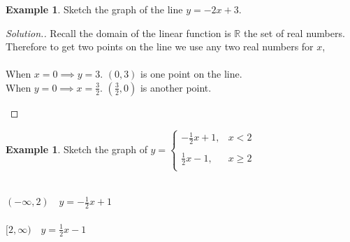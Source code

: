 \documentclass[11pt,a4paper]{article}
\theoremstyle{definition}
\newtheorem{example}[thm]{Example}
\newenvironment{solution}
  {\renewcommand{\qedsymbol}{}\begin{proof}[\textit{Solution}.]}
  {\end{proof}}
\begin{document}
\begin{example}

Sketch the graph of the line $y=-2x+3$.
\end{example}
\begin{solution}

Recall the domain of the linear function is $\mathbb{R}$ the set of real numbers. Therefore to get two points on the line we use any two real numbers for $x$,\\\\
When $x=0\implies y=3$. $(0,3)$ is one point on the line.\\
When $y=0\implies x=\frac{3}{2}$. $\left(\frac{3}{2},0\right)$ is another point.


\begin{figure}[H]
\centering
{}
\end{figure}
\end{solution}
\begin{example}

Sketch the graph of $y=
\begin{cases}
-\frac{1}{2}x+1, &x<2\\\\
\frac{1}{2}x-1, & x\geq 2\\
\end{cases}
$\\\\
\vspace{0.2cm}


$(-\infty,2)\quad  y=-\frac{1}{2}x+1$\\\\
$[2,\infty)\quad  y=\frac{1}{2}x-1$
\end{example}
\end{document}
